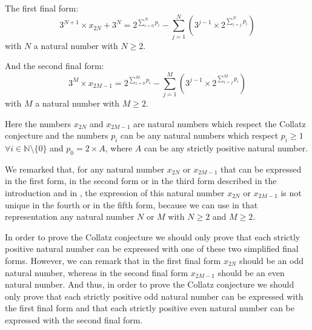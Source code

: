 \documentclass[11pt,a4paper]{article}
\newcommand{\N}{\mathbb{N}}
\newcommand{\Pf}[4]{2^{\sum_{#4=0}^{#1}#3_{#4}}-\sum_{j=1}^{#2}\left(3^{j-1}\times 2^{\sum_{#4=j}^{#1}#3_{#4}}\right)}
\theoremstyle{definition}
\begin{document}
\smallskip\noindent The first final form:
\begin{equation}
3^{N+1}\times x_{2N}+3^{N}=\Pf{N}{N}{p}{i}
\end{equation}
with $N$ a natural number with $N\ge 2$.

\smallskip\noindent And the second final form:
\begin{equation}
3^{M}\times x_{2M-1}=\Pf{M}{M}{p}{i}
\end{equation}
with $M$ a natural number with $M\ge 2$.

\smallskip\noindent Here the numbers $x_{2N}$ and $x_{2M-1}$ are natural numbers which
respect the Collatz conjecture and the numbers $p_i$ can be any natural numbers which
respect $p_i\ge 1$ $\forall i\in\N\setminus\{0\}$ and $p_0=2\times A$, where $A$ can be any
strictly positive natural number.

We remarked that, for any natural number $x_{2N}$ or $x_{2M-1}$ that can be expressed in
the first form, in the second form or in the third form described in the introduction and
in \citep{Louiz2024}, the expression of this natural number $x_{2N}$ or $x_{2M-1}$ is not unique in the fourth or
in the fifth form, because we can use in that representation any natural number $N$ or $M$
with $N\ge 2$ and $M\ge 2$.

In order to prove the Collatz conjecture we should only prove that each strictly positive
natural number can be expressed with one of these two simplified final forms. However, we
can remark that in the first final form $x_{2N}$ should be an odd natural number, whereas
in the second final form $x_{2M-1}$ should be an even natural number. And thus, in order to
prove the Collatz conjecture we should only prove that each strictly positive odd natural
number can be expressed with the first final form and that each strictly positive even
natural number can be expressed with the second final form.
\end{document}
